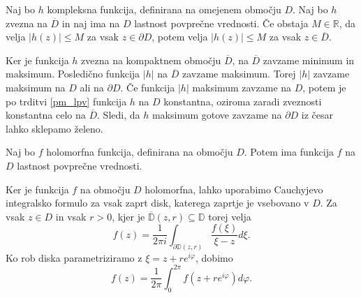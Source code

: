 \documentclass[mat1, tisk]{fmfdelo}
\begin{document}
    \begin{posledica}
        \label{posledica_pm_lpv}
        Naj bo $h$  kompleksna funkcija, definirana na omejenem območju $D$. Naj bo $h$ zvezna na $\overline{D}$ in naj ima na $D$ lastnost povprečne vrednosti. 
        Če obstaja $M \in \mathbb{R}$, da velja $|h(z)| \leq M$ za vsak $z \in \partial D$, potem velja $|h(z)| \leq M$ za vsak $z \in \overline{D}$. 
    \end{posledica}
    \begin{dokaz}
        Ker je funkcija $h$ zvezna na kompaktnem območju $\overline{D}$, na $\overline{D}$ zavzame minimum in maksimum. Posledično funkcija $|h|$ na $\overline{D}$ zavzame maksimum. 
        Torej $|h|$ zavzame maksimum na $D$ ali na $\partial D$. Če funkcija $|h|$ maksimum zavzame na $D$, potem je po trditvi \ref{pm_lpv} funkcija $h$ na $D$ konstantna, oziroma zaradi zveznosti konstantna celo na $\overline{D}$. 
        Sledi, da $h$ maksimum gotove zavzame na $\partial D$ iz česar lahko sklepamo želeno.
    \end{dokaz}

    \begin{trditev}
        Naj bo $f$ holomorfna funkcija, definirana na območju $D$. Potem ima funkcija $f$ na $D$ lastnost povprečne vrednosti.
    \end{trditev}
    \begin{dokaz}
        Ker je funkcija $f$ na območju $D$ holomorfna, lahko uporabimo Cauchyjevo integralsko formulo za vsak zaprt disk, katerega zaprtje je vsebovano v $D$. Za vsak $z \in D$ in vsak $r > 0$, kjer je $\overline{\mathbb{D}}(z,r) \subseteq \mathbb{D}$ torej velja
        $$
        f(z) = \frac{1}{2 \pi i} \int_{\partial \mathbb{D}(z, r)}{\frac{f(\xi)}{\xi  - z}}d\xi.
        $$
        Ko rob diska parametriziramo z $\xi = z + r e^{i \varphi}$, dobimo
        $$
        f(z) = \frac{1}{2 \pi} \int_{0}^{2\pi}{f(z + re^{i\varphi})}d\varphi.
        $$
    \end{dokaz}
\end{document}
